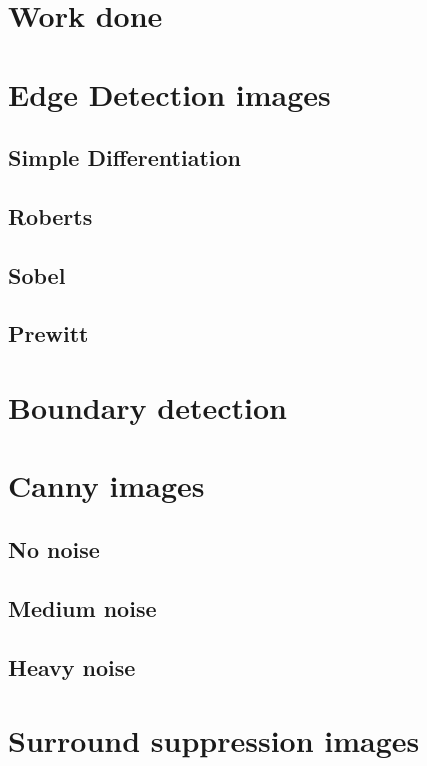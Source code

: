 \documentclass[10pt,a4paper]{article}
\begin{document}
\section{Work done}

\section{Edge Detection images}
\subsection{Simple Differentiation}



\subsection{Roberts}


\subsection{Sobel}


\subsection{Prewitt}



\section{Boundary detection}


\section{Canny images}
\subsection{No noise}

\subsection{Medium noise}

\subsection{Heavy noise}


\section{Surround suppression images}
\end{document}
